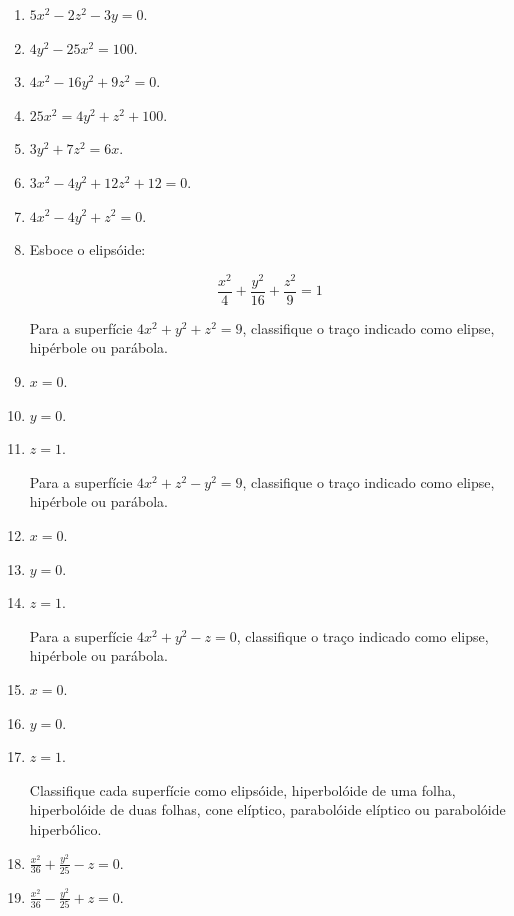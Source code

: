 \documentclass[11pt,a4paper]{article}
\begin{document}
\begin{enumerate}
	 
	 
	 
	 \item $5x^2 - 2z^2 - 3y = 0$.
	 \item $4y^2 - 25x^2 = 100$.
	 \item $4x^2 - 16y^2 + 9z^2 = 0$.
	 \item $25x^2 = 4y^2 + z^2 + 100$.
	 \item $3y^2 + 7z^2 = 6x$.
	 \item $3x^2 - 4y^2 + 12z^2 + 12 = 0$.
	 \item $4x^2 - 4y^2 +z^2 = 0$.
	 \item Esboce o elipsóide:
	 
	 $$\displaystyle\frac{x^2}{4} + \displaystyle\frac{y^2}{16} + \displaystyle\frac{z^2}{9} = 1$$
	 
	 Para a superfície $4x^2 + y^2 + z^2 = 9$, classifique o traço indicado como elipse, hipérbole ou parábola.
	 
	 
	 
	 
	 
	 
	 \item $x = 0$.
	 \item $y = 0$.
	 \item $z = 1$.
	 
	  Para a superfície $4x^2 + z^2 - y^2 = 9$, classifique o traço indicado como elipse, hipérbole ou parábola.
	 
	 \item $x = 0$.
	 \item $y = 0$.
	 \item $z = 1$.
	 
	 Para a superfície $4x^2 + y^2 - z = 0$, classifique o traço indicado como elipse, hipérbole ou parábola.
	 
	 \item $x = 0$.
	 \item $y = 0$.
	 
	 
	 
	 
	 
	 \item $z = 1$.
	 
	 Classifique cada superfície como elipsóide, hiperbolóide de uma folha, hiperbolóide de duas folhas, cone elíptico, parabolóide elíptico ou parabolóide hiperbólico.
	 
	 \item $\displaystyle\frac{x^2}{36} + \displaystyle\frac{y^2}{25} - z = 0 $.
	 
	 \item $\displaystyle\frac{x^2}{36} - \displaystyle\frac{y^2}{25} + z = 0 $.
	

\end{enumerate}
\end{document}
